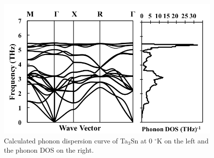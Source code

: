 \pagebreak
\begin{figure}[H]
	\centering
	\includegraphics[width=\textwidth]{Chapter-4/Figures/Ta3Snphonondos.png}
	\caption{Calculated phonon dispersion curve of Ta$_3$Sn at 0 $^\circ$K on the left and the phonon DOS on the right.}
	\label{Ch4-figure:Ta3Snphonon}
\end{figure}

